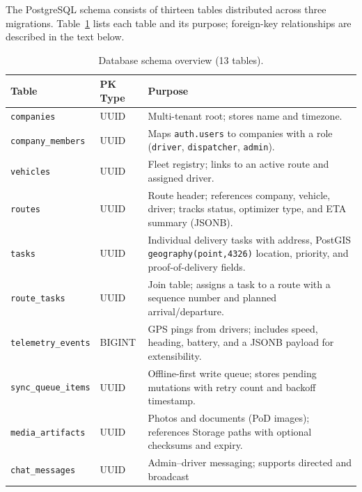 The PostgreSQL schema consists of thirteen tables distributed across three migrations.
Table~\ref{tab:schema} lists each table and its purpose; foreign-key
relationships are described in the text below.

\begin{table}[ht]
  \centering
  \caption{Database schema overview (13 tables).}
  \label{tab:schema}
  \small
  \begin{tabularx}{\textwidth}{l l X}
    \toprule
    \textbf{Table} & \textbf{PK Type} & \textbf{Purpose} \\
    \midrule
    \texttt{companies}          & UUID & Multi-tenant root; stores name and timezone. \\
    \texttt{company\_members}   & UUID & Maps \texttt{auth.users} to companies with a role
                                         (\texttt{driver}, \texttt{dispatcher}, \texttt{admin}). \\
    \texttt{vehicles}           & UUID & Fleet registry; links to an active route and assigned driver. \\
    \texttt{routes}             & UUID & Route header; references company, vehicle, driver; tracks
                                         status, optimizer type, and ETA summary (JSONB). \\
    \texttt{tasks}              & UUID & Individual delivery tasks with address, PostGIS
                                         \texttt{geography(point,4326)} location, priority, and
                                         proof-of-delivery fields. \\
    \texttt{route\_tasks}       & UUID & Join table; assigns a task to a route with a sequence
                                         number and planned arrival/departure. \\
    \texttt{telemetry\_events}  & BIGINT & GPS pings from drivers; includes speed, heading,
                                            battery, and a JSONB payload for extensibility. \\
    \texttt{sync\_queue\_items} & UUID & Offline-first write queue; stores pending mutations with
                                          retry count and backoff timestamp. \\
    \texttt{media\_artifacts}   & UUID & Photos and documents (PoD images); references Storage
                                          paths with optional checksums and expiry. \\
    \texttt{chat\_messages}     & UUID & Admin--driver messaging; supports directed and broadcast

\end{tabularx}
\end{table}
